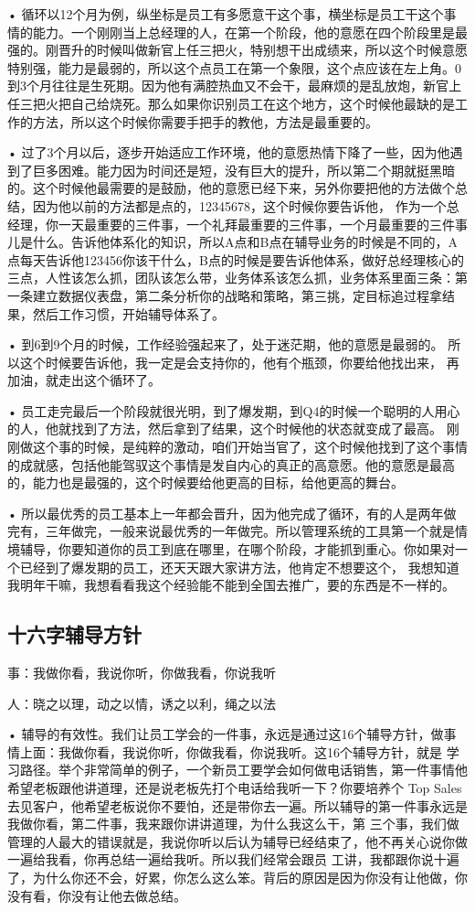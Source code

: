 \documentclass[12pt]{article}
\begin{document}
• 循环以12个月为例，纵坐标是员工有多愿意干这个事，横坐标是员工干这个事情的能力。一个刚刚当上总经理的人，在第一个阶段，他的意愿在四个阶段里是最强的。刚晋升的时候叫做新官上任三把火，特别想干出成绩来，所以这个时候意愿特别强，能力是最弱的，所以这个点员工在第一个象限，这个点应该在左上角。0到3个月往往是生死期。因为他有满腔热血又不会干，最麻烦的是乱放炮，新官上任三把火把自己给烧死。那么如果你识别员工在这个地方，这个时候他最缺的是工作的方法，所以这个时候你需要手把手的教他，方法是最重要的。

• 过了3个月以后，逐步开始适应工作环境，他的意愿热情下降了一些，因为他遇到了巨多困难。能力因为时间还是短，没有巨大的提升，所以第二个期就挺黑暗的。这个时候他最需要的是鼓励，他的意愿已经下来，另外你要把他的方法做个总结，因为他以前的方法都是点的，12345678，这个时候你要告诉他， 作为一个总经理，你一天最重要的三件事，一个礼拜最重要的三件事，一个月最重要的三件事儿是什么。告诉他体系化的知识，所以A点和B点在辅导业务的时候是不同的，A点每天告诉他123456你该干什么，B点的时候是要告诉他体系，做好总经理核心的三点，人性该怎么抓，团队该怎么带，业务体系该怎么抓，业务体系里面三条：第一条建立数据仪表盘，第二条分析你的战略和策略，第三挑，定目标追过程拿结果，然后工作习惯，开始辅导体系了。

• 到6到9个月的时候，工作经验强起来了，处于迷茫期，他的意愿是最弱的。 所以这个时候要告诉他，我一定是会支持你的，他有个瓶颈，你要给他找出来， 再加油，就走出这个循环了。

• 员工走完最后一个阶段就很光明，到了爆发期，到Q4的时候一个聪明的人用心的人，他就找到了方法，然后拿到了结果，这个时候他的状态就变成了最高。 刚刚做这个事的时候，是纯粹的激动，咱们开始当官了，这个时候他找到了这个事情的成就感，包括他能驾驭这个事情是发自内心的真正的高意愿。他的意愿是最高的，能力也是最强的，这个时候要给他更高的目标，给他更高的舞台。

• 所以最优秀的员工基本上一年都会晋升，因为他完成了循环，有的人是两年做完有，三年做完，一般来说最优秀的一年做完。所以管理系统的工具第一个就是情境辅导，你要知道你的员工到底在哪里，在哪个阶段，才能抓到重心。你如果对一个已经到了爆发期的员工，还天天跟大家讲方法，他肯定不想要这个， 我想知道我明年干嘛，我想看看我这个经验能不能到全国去推广，要的东西是不一样的。

\subsection{十六字辅导方针}
\begin{framed}
事：我做你看，我说你听，你做我看，你说我听

人：晓之以理，动之以情，诱之以利，绳之以法
\end{framed}
• 辅导的有效性。我们让员工学会的一件事，永远是通过这16个辅导方针，做事情上面：我做你看，我说你听，你做我看，你说我听。这16个辅导方针，就是 学习路径。举个非常简单的例子，一个新员工要学会如何做电话销售，第一件事情他希望老板跟他讲道理，还是说老板先打个电话给我听一下？你要培养个 Top Sales去见客户，他希望老板说你不要怕，还是带你去一遍。所以辅导的第一件事永远是我做你看，第二件事，我来跟你讲讲道理，为什么我这么干，第 三个事，我们做管理的人最大的错误就是，我说你听以后认为辅导已经结束了，他不再关心说你做一遍给我看，你再总结一遍给我听。所以我们经常会跟员 工讲，我都跟你说十遍了，为什么你还不会，好累，你怎么这么笨。背后的原因是因为你没有让他做，你没有看，你没有让他去做总结。
\end{document}
